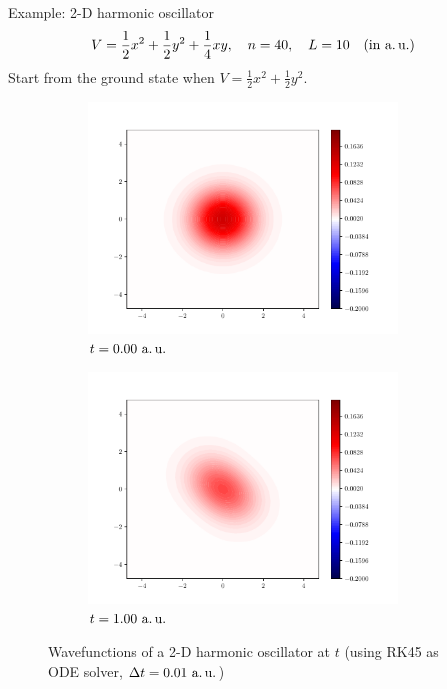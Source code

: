 \documentclass[12pt]{beamer}
\begin{document}
    \begin{frame}{Example: 2-D harmonic oscillator}
        $$V = \frac{1}{2}x^2 + \frac{1}{2}y^2 + \frac{1}{4}xy \qc n=40 \qc L=10 \qq{(in a.\,u.)}$$
        Start from the ground state when $V = \frac{1}{2}x^2 + \frac{1}{2}y^2$.
        \begin{figure}
            \begin{subfigure}[b]{0.4\textwidth}
                \centering
                \includegraphics[width=0.9\textwidth]{functions-00000000.pdf}
                \caption*{$t = 0.00~\text{a.\,u.}$}
            \end{subfigure}
            \begin{subfigure}[b]{0.4\textwidth}
                \centering
                \includegraphics[width=0.9\textwidth]{functions-00001000.pdf}
                \caption*{$t = 1.00~\text{a.\,u.}$}
            \end{subfigure}
            \caption{Wavefunctions of a 2-D harmonic oscillator at $t$ (using RK45 as ODE solver, $\Delta t = 0.01~\text{a.\,u.}$)}
        \end{figure}
    \end{frame}
\end{document}
